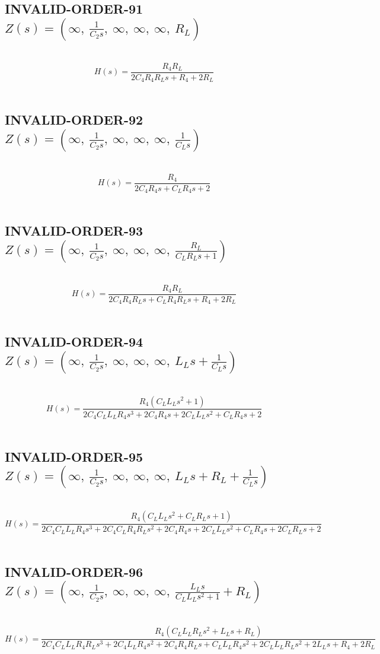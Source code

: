 \documentclass{article}
\begin{document}
\subsection{INVALID-ORDER-91 $Z(s) = \left( \infty, \  \frac{1}{C_{2} s}, \  \infty, \  \infty, \  \infty, \  R_{L}\right)$ } \ 
\textbf{\[H(s) = \frac{R_{4} R_{L}}{2 C_{4} R_{4} R_{L} s + R_{4} + 2 R_{L}}\] } \ 
\subsection{INVALID-ORDER-92 $Z(s) = \left( \infty, \  \frac{1}{C_{2} s}, \  \infty, \  \infty, \  \infty, \  \frac{1}{C_{L} s}\right)$ } \ 
\textbf{\[H(s) = \frac{R_{4}}{2 C_{4} R_{4} s + C_{L} R_{4} s + 2}\] } \ 
\subsection{INVALID-ORDER-93 $Z(s) = \left( \infty, \  \frac{1}{C_{2} s}, \  \infty, \  \infty, \  \infty, \  \frac{R_{L}}{C_{L} R_{L} s + 1}\right)$ } \ 
\textbf{\[H(s) = \frac{R_{4} R_{L}}{2 C_{4} R_{4} R_{L} s + C_{L} R_{4} R_{L} s + R_{4} + 2 R_{L}}\] } \ 
\subsection{INVALID-ORDER-94 $Z(s) = \left( \infty, \  \frac{1}{C_{2} s}, \  \infty, \  \infty, \  \infty, \  L_{L} s + \frac{1}{C_{L} s}\right)$ } \ 
\textbf{\[H(s) = \frac{R_{4} \left(C_{L} L_{L} s^{2} + 1\right)}{2 C_{4} C_{L} L_{L} R_{4} s^{3} + 2 C_{4} R_{4} s + 2 C_{L} L_{L} s^{2} + C_{L} R_{4} s + 2}\] } \ 
\subsection{INVALID-ORDER-95 $Z(s) = \left( \infty, \  \frac{1}{C_{2} s}, \  \infty, \  \infty, \  \infty, \  L_{L} s + R_{L} + \frac{1}{C_{L} s}\right)$ } \ 
\textbf{\[H(s) = \frac{R_{4} \left(C_{L} L_{L} s^{2} + C_{L} R_{L} s + 1\right)}{2 C_{4} C_{L} L_{L} R_{4} s^{3} + 2 C_{4} C_{L} R_{4} R_{L} s^{2} + 2 C_{4} R_{4} s + 2 C_{L} L_{L} s^{2} + C_{L} R_{4} s + 2 C_{L} R_{L} s + 2}\] } \ 
\subsection{INVALID-ORDER-96 $Z(s) = \left( \infty, \  \frac{1}{C_{2} s}, \  \infty, \  \infty, \  \infty, \  \frac{L_{L} s}{C_{L} L_{L} s^{2} + 1} + R_{L}\right)$ } \ 
\textbf{\[H(s) = \frac{R_{4} \left(C_{L} L_{L} R_{L} s^{2} + L_{L} s + R_{L}\right)}{2 C_{4} C_{L} L_{L} R_{4} R_{L} s^{3} + 2 C_{4} L_{L} R_{4} s^{2} + 2 C_{4} R_{4} R_{L} s + C_{L} L_{L} R_{4} s^{2} + 2 C_{L} L_{L} R_{L} s^{2} + 2 L_{L} s + R_{4} + 2 R_{L}}\] } \ 
\end{document}
